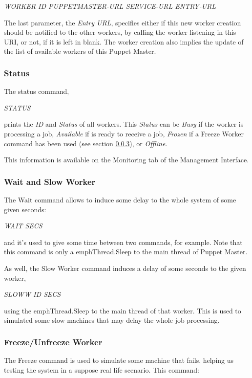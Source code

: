 \documentclass[times, 10pt,twocolumn]{article}
\begin{document}
            \emph{WORKER ID PUPPETMASTER-URL SERVICE-URL ENTRY-URL} 
            
            The last parameter, the \emph{Entry URL}, specifies either if this new worker creation should be notified to the other workers, by calling the worker listening in this URI, or not, if it is left in blank.
            The worker creation also implies the update of the list of available workers of this Puppet Master.
            \subsubsection{Status}
            
            The status command,  
            
            \emph{STATUS}
            
            prints the \emph{ID} and \emph{Status} of all workers. This \emph{Status} can be  \emph{Busy} if the worker is processing a job, \emph{Available} if is ready to receive a job, \emph{Frozen} if a Freeze Worker command has been used (see section \ref{freeze}), or \emph{Offline}.
            
            This information is available on the Monitoring tab of the Management Interface. 
                   	
            \subsubsection{Wait and Slow Worker}
			The Wait command allows to induce some delay to the whole system of some given seconds:
            
            \emph{WAIT SECS}
            
            and it's used to give some time between two commands, for example. Note that this command is only a emph{Thread.Sleep} to the main thread of Puppet Master. 
            
            As well, the Slow Worker command induces a delay of some seconds to the given worker, 
            
            \emph{SLOWW ID SECS}
            
			using the emph{Thread.Sleep} to the main thread of that worker. This is used to simulated some slow machines that may delay the whole job processing.
            
            \subsubsection{Freeze/Unfreeze Worker} \label{freeze}
            The Freeze command is used to simulate some machine that fails, helping us testing the system in a suppose real life scenario. This command: 
            
\end{document}
